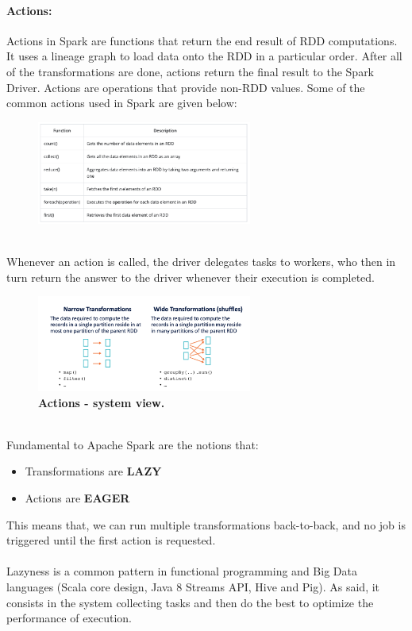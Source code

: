 \documentclass[10pt,a4paper]{article}
\newcommand{\nline}{\\~\\}
\begin{document}
 \paragraph{Actions:}
 Actions in Spark are functions that return the end result of RDD computations. It uses a lineage graph to load data onto the RDD in a particular order. After all of the transformations are done, actions return the final result to the Spark Driver. Actions are operations that provide non-RDD values. Some of the common actions used in Spark are given below:
    \begin{figure}[ht!]
 \hfill \includegraphics[width=200pt]{images/spark-rdd-actions}
 \hspace*{\fill}
 \end{figure}  \\
 Whenever an action is called, the driver delegates tasks to workers, who then in turn return the answer to the driver whenever their execution is completed.
       \begin{figure}[ht!]
 \hfill \includegraphics[width=200pt]{images/spark-rdd-transformation-physical}
 \hspace*{\fill}
 \caption{\textbf{Actions - system view.}}
 \end{figure}  \\
 Fundamental to Apache Spark are the notions that:
 \begin{itemize}
 	\item Transformations are \textbf{LAZY}
 	\item Actions are \textbf{EAGER}
 \end{itemize}
 This means that, we can run multiple transformations back-to-back, and no job is triggered until the first action is requested. \nline
 Lazyness is a common pattern in functional programming and Big Data languages (Scala core design, Java 8 Streams API, Hive and Pig). As said, it consists in the system collecting tasks and then do the best to optimize the performance of execution. \\
\end{document}
